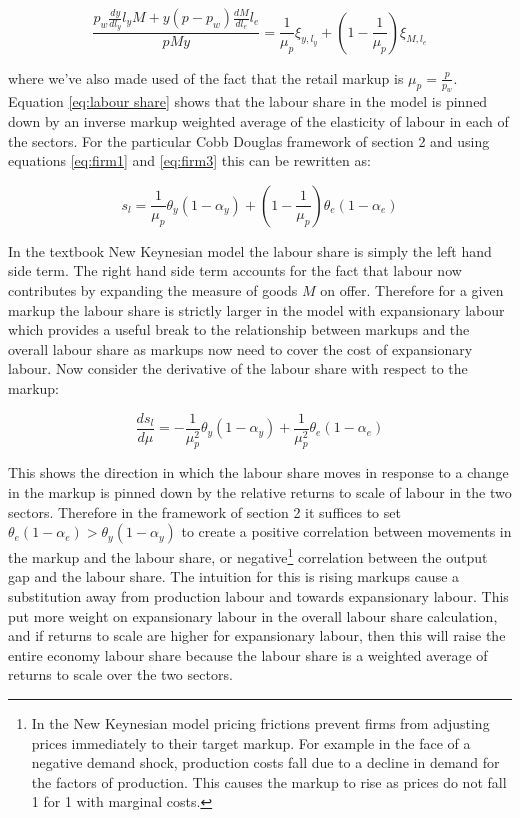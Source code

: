 \documentclass[12pt]{article}
\begin{document}
\begin{equation}\label{eq:labour share}
    \frac{p_{w} \frac{dy}{d l_{y}} l_{y}M  +y(p-p_w)\frac{dM}{d l_{e}}l_{e} }{pMy} = \frac{1}{\mu_p} \xi_{y,l_{y}} + (1-\frac{1}{\mu_p})\xi_{M,l_{e}}
\end{equation}

where we've also made used of the fact that the retail markup is $\mu_{p}=\frac{p}{p_w}$. Equation \ref{eq:labour share} shows that the labour share in the model is pinned down by an inverse markup weighted average of the elasticity of labour in each of the sectors. For the particular Cobb Douglas framework of section 2 and using equations \ref{eq:firm1} and \ref{eq:firm3} this can be rewritten as:

\begin{equation}\label{eq:labour share2}
    s_l= \frac{1}{\mu_p} \theta_{y} (1-\alpha_{y}) + (1-\frac{1}{\mu_p})\theta_{e}(1-\alpha_{e})
\end{equation}

 In the textbook New Keynesian model the labour share is simply the left hand side term. The right hand side term accounts for the fact that labour now contributes by expanding the measure of goods $M$ on offer. Therefore for a given markup the labour share is strictly larger in the model with expansionary labour which provides a useful break to the relationship between markups and the overall labour share as markups now need to cover the cost of expansionary labour. Now consider the derivative of the labour share with respect to the markup: 

\begin{equation}
    \frac{d s_l}{d\mu}=-\frac{1}{\mu_p^2} \theta_{y} (1-\alpha_{y}) +\frac{1}{\mu_p^2}\theta_{e}(1-\alpha_{e})
\end{equation}

This shows the direction in which the labour share moves in response to a change in the markup is pinned down by the relative returns to scale of labour in the two sectors. Therefore in the framework of section 2 it suffices to set $\theta_{e}(1-\alpha_{e}) > \theta_{y}(1-\alpha_{y}) $ to create a positive correlation between movements in the markup and the labour share, or negative\footnote{In the New Keynesian model pricing frictions prevent firms from adjusting prices immediately to their target markup. For example in the face of a negative demand shock, production costs fall due to a decline in demand for the factors of production. This causes the markup to rise as prices do not fall 1 for 1 with marginal costs.} correlation between the output gap and the labour share. The intuition for this is rising markups cause a substitution away from production labour and towards expansionary labour. This put more weight on expansionary labour in the overall labour share calculation, and if returns to scale are higher for expansionary labour, then this will raise the entire economy labour share because the labour share is a weighted average of returns to scale over the two sectors. 
\end{document}
